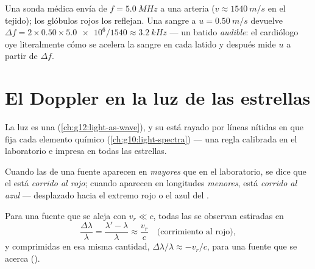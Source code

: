 \begin{example}\label{ex:g12:doppler-effect:ultrasound}
Una sonda médica envía  de $f = \qty{5.0}{MHz}$ a una
arteria ($v \approx \qty{1540}{m/s}$ en el tejido); los glóbulos rojos
los reflejan. Una sangre a $u = \qty{0.50}{m/s}$ devuelve
$\Delta f = 2 \times 0.50 \times \num{5.0e6}/1540 \approx \qty{3.2}{kHz}$
--- un batido \emph{audible}: el cardiólogo oye literalmente cómo se
acelera la sangre en cada latido y después mide $u$ a partir de
$\Delta f$.
\end{example}

\section{El Doppler en la luz de las estrellas}

La luz es una  (\cref{ch:g12:light-as-wave}), y su  está
rayado por líneas nítidas en  que fija cada elemento
químico (\cref{ch:g10:light-spectra}) --- una regla calibrada en el
laboratorio e impresa en todas las estrellas.

\begin{definition}\label{def:g12:doppler-effect:redshift}
Cuando las  de una fuente aparecen en  \emph{mayores} que en el laboratorio, se dice que el  está
\emph{corrido al rojo}; cuando aparecen en
longitudes \emph{menores}, está \emph{corrido al
azul} --- desplazado hacia el extremo rojo o
el azul del .
\end{definition}

\begin{proposition}\label{prop:g12:doppler-effect:light}
Para una fuente que se aleja con  $v_r \ll c$, todas las
 se observan estiradas en
\[ \frac{\Delta \lambda}{\lambda} = \frac{\lambda' - \lambda}{\lambda} \approx \frac{v_r}{c} \quad \text{(corrimiento al rojo)}, \]
y comprimidas en esa misma cantidad,
$\Delta\lambda/\lambda \approx -v_r/c$, para una fuente que se acerca
().
\end{proposition}
\admitted

